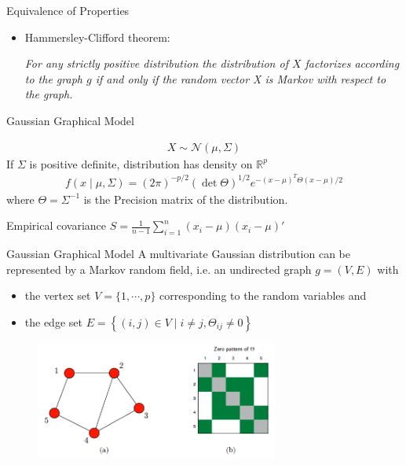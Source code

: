 \documentclass{beamer}
\begin{document}
\begin{frame}{Equivalence of Properties}
\begin{itemize}
	\item Hammersley-Clifford theorem: \begin{center}
		\textit{For any strictly positive distribution the distribution of $X$ factorizes according to the graph $g$ if and only if the random vector X is Markov with respect to the graph.} \cite{hastie2015statistical}
	\end{center}
\end{itemize}
\end{frame}


\begin{frame}{Gaussian Graphical Model}
\begin{center}
		\begin{tcolorbox}[width = 4.5in, interior hidden, boxsep = 0pt,
			left = 2pt, right = 2pt, top = 2pt]
			\begin{align*}
			X \sim \mathcal{N}(\mu, \Sigma)
			\end{align*}
			If $\Sigma$ is positive definite, distribution has density on $\mathbb{R}^{p}$
\begin{align*}
	f(x \mid \mu, \Sigma)=(2 \pi)^{-p / 2}(\operatorname{det} \Theta)^{1 / 2} e^{-(x-\mu)^{T} \Theta(x-\mu) / 2}
\end{align*}
where $\Theta=\Sigma^{-1}$ is the Precision matrix of the distribution.
		\end{tcolorbox}	
\end{center}

Empirical covariance $S = \frac{1}{n-1} \sum_{i=1}^{n}\left(x_{i}-\mu\right)\left(x_{i}-\mu\right)'$

\end{frame}

\begin{frame}{Gaussian Graphical Model}
	A multivariate Gaussian distribution can be represented by a Markov random field, i.e. an undirected graph $g = (V, E)$ with
	\begin{itemize}
		\item the vertex set $V = \{1, \cdots, p \}$ corresponding to the random variables and
		\item the edge set $E = \left\{(i, j) \in V \mid i \neq j, \Theta_{i j} \neq 0\right\}$
	\end{itemize}
	\begin{figure}
		\includegraphics[trim={0 2cm 0 0}, clip,width = 8cm]{IntroGraphMat}
	\end{figure}
\end{frame}
\end{document}
